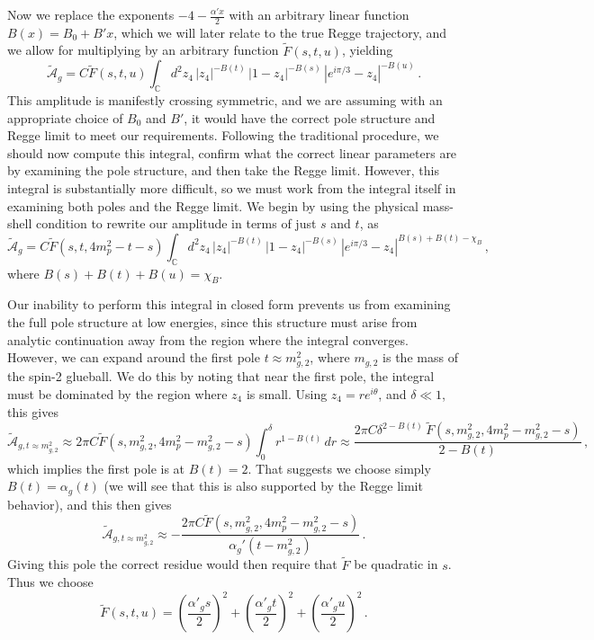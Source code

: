 \documentclass[aps, prd, preprintnumbers, floatfix, showpacs, showkeys, nofootinbib, 10pt]{revtex4-1}
\def\beq{\begin{equation}}
\def\eeq{\end{equation}}
\begin{document}
Now we replace the exponents $-4 - \frac{\alpha' x}{2}$ with an arbitrary linear function $B(x) = B_0 + B'x$, which we will later relate to the true Regge trajectory, and we allow for multiplying by an arbitrary function $\tilde{F}(s, t, u)$, yielding
\beq
\tilde{\mathcal{A}}_{g} = C\tilde{F}(s, t, u)\int_{\mathbb{C}} d^2 z_4 \, |z_4|^{-B(t)} \, |1 - z_4|^{-B(s)} \, \left|e^{i\pi/3} - z_4\right|^{-B(u)} \, .
\eeq
This amplitude is manifestly crossing symmetric, and we are assuming with an appropriate choice of $B_0$ and $B'$, it would have the correct pole structure and Regge limit to meet our requirements.  Following the traditional procedure, we should now compute this integral, confirm what the correct linear parameters are by examining the pole structure, and then take the Regge limit.  However, this integral is substantially more difficult, so we must work from the integral itself in examining both poles and the Regge limit.  We begin by using the physical mass-shell condition to rewrite our amplitude in terms of just $s$ and $t$, as
\beq
\label{eqn:stint}
\tilde{\mathcal{A}}_{g} = C\tilde{F}(s, t, 4m_p^2 - t - s)\int_{\mathbb{C}} d^2 z_4 \, |z_4|^{-B(t)} \, |1 - z_4|^{-B(s)} \, \left|e^{i\pi/3} - z_4\right|^{B(s) + B(t) - \chi_B} \, ,
\eeq
where $B(s) + B(t) + B(u) = \chi_B$.  

Our inability to perform this integral in closed form prevents us from examining the full pole structure at low energies, since this structure must arise from analytic continuation away from the region where the integral converges.  However, we can expand around the first pole $t \approx m_{g, 2}^2$, where $m_{g,2}$ is the mass of the spin-2 glueball.  We do this by noting that near the first pole, the integral must be dominated by the region where $z_4$ is small.  Using $z_4 = r e^{i\theta}$, and $\delta \ll 1$, this gives
\beq
\tilde{\mathcal{A}}_{g, t \approx m_{g, 2}^2} \approx 2\pi C\tilde{F}(s, m_{g, 2}^2, 4m_p^2 - m_{g, 2}^2 - s)\int_{0}^{\delta} r^{1 - B(t)} \, dr \approx \frac{2\pi C \delta^{2 - B(t)} \, \tilde{F}(s, m_{g, 2}^2, 4m_p^2 - m_{g, 2}^2 - s)}{2 - B(t)} \, ,
\eeq
which implies the first pole is at $B(t) = 2$.  That suggests we choose simply $B(t) = \alpha_g(t)$ (we will see that this is also supported by the Regge limit behavior), and this then gives
\beq
\tilde{\mathcal{A}}_{g, t \approx m_{g, 2}^2} \approx -\frac{2\pi C\tilde{F}(s, m_{g, 2}^2, 4m_p^2 - m_{g, 2}^2 - s)}{\alpha_g'(t - m_{g, 2}^2)} \, .
\eeq
Giving this pole the correct residue would then require that $\tilde{F}$ be quadratic in $s$.  Thus we choose
\beq
\tilde{F}(s, t, u) = \left(\frac{\alpha'_g s}{2}\right)^{2} + \left(\frac{\alpha'_g t}{2}\right)^{2} + \left(\frac{\alpha'_g u}{2}\right)^{2} \, .
\eeq 
\end{document}
